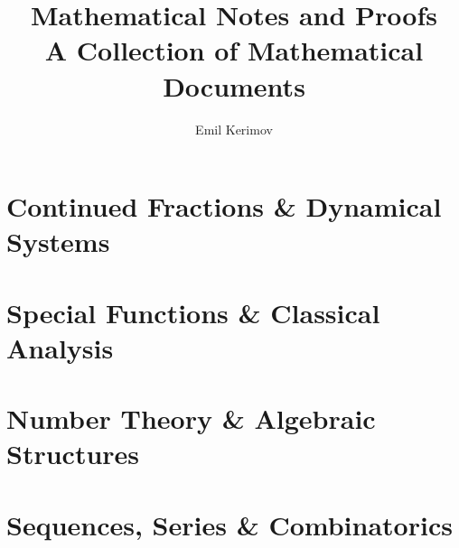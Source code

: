 \documentclass[a4paper]{article}
\title{\textbf{Mathematical Notes and Proofs}\\
\large A Collection of Mathematical Documents}
\author{Emil Kerimov}
\begin{document}
\maketitle

\setcounter{tocdepth}{2}
\tableofcontents
\clearpage

\part{Continued Fractions \& Dynamical Systems}

\clearpage


\clearpage

\part{Special Functions \& Classical Analysis}

\clearpage


\clearpage


\clearpage


\clearpage


\clearpage


\clearpage


\clearpage


\clearpage


\clearpage


\clearpage

\part{Number Theory \& Algebraic Structures}

\clearpage


\clearpage

\part{Sequences, Series \& Combinatorics}

\clearpage
\end{document}

